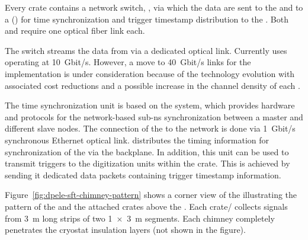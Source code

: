 Every  crate contains a network switch, , via which the data are sent to the   and to %
a () for %
time synchronization and trigger timestamp distribution to the . Both  and  require one optical fiber link each. 

The  switch streams the data from  via a dedicated optical link. Currently  uses  operating at \SI{10}{Gbit/s}. However, a move to \SI{40}{Gbit/s} links for the  implementation is under consideration because of the technology evolution with associated cost reductions and a possible increase in the channel density of each .

The  time synchronization unit is based on the  system, which provides hardware and protocols for the network-based sub-\si{\nano\s} synchronization between a master and different slave nodes. The connection of the  to the  network is done via \SI{1}{Gbit/s} synchronous Ethernet optical link.  distributes the timing information for synchronization of the  via the  backplane. In addition, this unit can be used to transmit triggers to the digitization units within the crate. This is achieved by sending it dedicated data packets containing trigger timestamp information. 

Figure~\ref{fig:dpele-sft-chimney-pattern} shows a corner view of the  illustrating the pattern of the  and the attached  crates above the . Each crate/ collects signals from \SI{3}{\meter} long strips of two \SI[product-units=power]{1x3}{\meter}  segments. Each chimney completely %
penetrates the cryostat insulation layers (not shown in the figure). 


